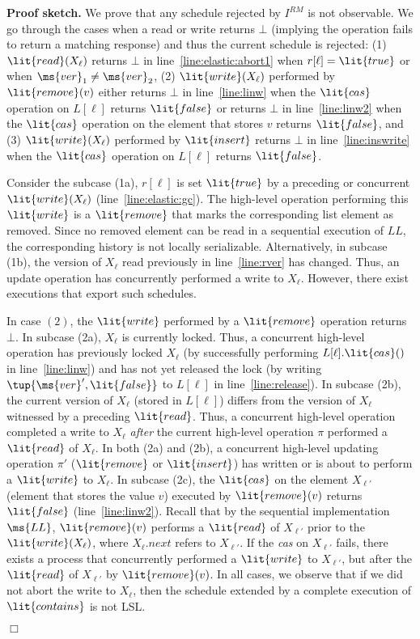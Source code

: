 \documentclass[11pt,pdftex,letterpaper]{article}
\newenvironment{proofsketch}[1][Proof sketch]{\noindent\textbf{#1.} }{\hfill $\Box$\\[2mm]}
\newcommand{\true}{\lit{true}}
\newcommand{\false}{\lit{false}}
\newcommand{\LL}{\ms{LL}}
\begin{document}
\begin{proofsketch}
We prove that any schedule rejected by $I^{RM}$ is  
not observable.
We go through the cases when a read or write returns $\bot$ (implying the operation fails to return a matching response) and
thus the current schedule is rejected:
(1) $\lit{read}(X_{\ell})$ returns $\bot$ in line~\ref{line:elastic:abort1}
when $r[\ell]=\true$ or when $\ms{ver}_1\neq \ms{ver}_2$, (2)
$\lit{write}(X_{\ell})$ performed by $\lit{remove}(v)$ either returns $\bot$
in line~\ref{line:linw} when the $\lit{cas}$ operation on
$L[\ell]$ returns $\false$ or returns $\bot$
in line~\ref{line:linw2} when the $\lit{cas}$ operation on the element that
stores $v$ returns $\false$, and (3) $\lit{write}(X_{\ell})$ performed by $\lit{insert}$ returns $\bot$
in line~\ref{line:inswrite} when the $\lit{cas}$ operation on
$L[\ell]$ returns $\false$.

Consider the subcase (1a), $r[\ell]$ is set $\true$ by a
preceding or concurrent $\lit{write}(X_{\ell})$ (line~\ref{line:elastic:gc}).
The high-level operation performing this $\lit{write}$ is a $\lit{remove}$ 
that marks the corresponding list element as removed. 
Since no removed element can be read in a sequential execution
of $LL$, the corresponding history is not locally serializable.
Alternatively, in subcase (1b), the version of $X_{\ell}$ read previously in line~\ref{line:rver}
has changed. Thus, an update operation has concurrently performed a write to $X_{\ell}$.
However, there exist executions that export such schedules.

In case $(2)$, the $\lit{write}$ performed by a $\lit{remove}$ operation returns $\bot$.
In subcase (2a), $X_{\ell}$ is currently
locked. 
Thus, a concurrent high-level operation has previously locked $X_{\ell}$ (by successfully
performing $L[\ell].\lit{cas}()$ in line~\ref{line:linw}) and has not yet released
the lock (by writing $\tup{\ms{ver}', \lit{false}}$ to
$L[\ell]$ in line~\ref{line:release}). 
In subcase (2b), the current version of $X_{\ell}$ (stored in $L[\ell]$) differs 
from the version of $X_{\ell}$ witnessed by a preceding $\lit{read}$. 
Thus, a concurrent high-level operation completed a write to $X_{\ell}$
\emph{after} the current high-level operation $\pi$ performed a $\lit{read}$ of $X_{\ell}$.
In both (2a) and (2b), a concurrent high-level updating operation $\pi'$
($\lit{remove}$ or $\lit{insert}$) has written or is about to perform a $\lit{write}$ to $X_{\ell}$.  
In subcase (2c), the $\lit{cas}$ on the element $X_{\ell'}$ (element that stores the value $v$) executed by $\lit{remove}(v)$ 
returns $\false$ (line~\ref{line:linw2}).
Recall that by the sequential implementation $\LL$, 
$\lit{remove}(v)$ performs a $\lit{read}$ of
$X_{\ell'}$ prior to the $\lit{write}(X_{\ell})$, where $X_{\ell}.\textit{next}$
refers to $X_{\ell'}$.
If the \emph{cas} on $X_{\ell'}$ fails, there exists a process 
that concurrently performed a $\lit{write}$ to $X_{\ell'}$, but
after the $\lit{read}$ of $X_{\ell'}$ by $\lit{remove}(v)$.
In all cases, we observe that if we did not abort the write to $X_{\ell}$, then
the schedule extended by a complete execution of $\lit{contains}$ is not LSL.


\end{proofsketch}
\end{document}
